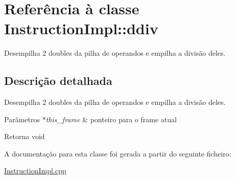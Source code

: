 \hypertarget{class_instruction_impl_1_1ddiv}{}\section{Referência à classe Instruction\+Impl\+:\+:ddiv}
\label{class_instruction_impl_1_1ddiv}


Desempilha 2 doubles da pilha de operandos e empilha a divisão deles.  




\subsection{Descrição detalhada}
Desempilha 2 doubles da pilha de operandos e empilha a divisão deles. 


\begin{DoxyParams}{Parâmetros}
{\em $\ast$this\+\_\+frame} & ponteiro para o frame atual \\
\hline
\end{DoxyParams}
\begin{DoxyReturn}{Retorna}
void 
\end{DoxyReturn}


A documentação para esta classe foi gerada a partir do seguinte ficheiro\+:\begin{DoxyCompactItemize}
\item 
\hyperlink{_instruction_impl_8cpp}{Instruction\+Impl.\+cpp}\end{DoxyCompactItemize}
